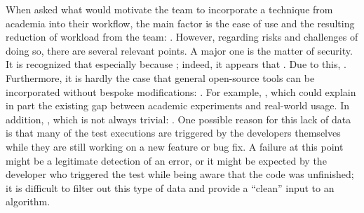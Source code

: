 When asked what would motivate the team to incorporate a technique from academia into their workflow, the main factor is the ease of use and the resulting reduction of workload from the team: .
However, regarding risks and challenges of doing so, there are several relevant points.
A major one is the matter of security.
It is recognized that  especially because ; indeed, it appears that .
Due to this, .
Furthermore, it is hardly the case that general open-source tools can be incorporated without bespoke modifications: .
For example, , which could explain in part the existing gap between academic experiments and real-world usage.
In addition, , which is not always trivial: .
One possible reason for this lack of data is that many of the test executions are triggered by the developers themselves while they are still working on a new feature or bug fix. 
A failure at this point might be a legitimate detection of an error, or it might be expected by the developer who triggered the test while being aware that the code was unfinished; it is difficult to filter out this type of data and provide a ``clean'' input to an algorithm.

